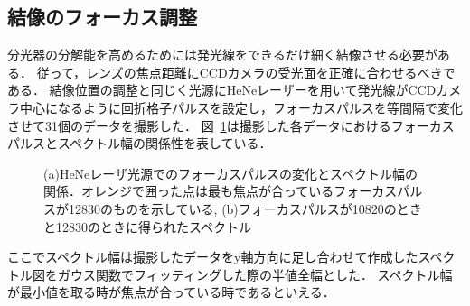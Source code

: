 \subsection{結像のフォーカス調整}
分光器の分解能を高めるためには発光線をできるだけ細く結像させる必要がある．
従って，レンズの焦点距離にCCDカメラの受光面を正確に合わせるべきである．
結像位置の調整と同じく光源にHeNeレーザーを用いて発光線がCCDカメラ中心になるように回折格子パルスを設定し，フォーカスパルスを等間隔で変化させて31個のデータを撮影した．
図\ \ref{fig:HeNe_focus_example}は撮影した各データにおけるフォーカスパルスとスペクトル幅の関係性を表している．
\begin{figure}
    \caption{
    (a)HeNeレーザ光源でのフォーカスパルスの変化とスペクトル幅の関係．オレンジで囲った点は最も焦点が合っているフォーカスパルスが12830のものを示している,
    (b)フォーカスパルスが10820のときと12830のときに得られたスペクトル}
    \label{fig:HeNe_focus_example}
\end{figure}
ここでスペクトル幅は撮影したデータをy軸方向に足し合わせて作成したスペクトル図をガウス関数でフィッティングした際の半値全幅とした．
スペクトル幅が最小値を取る時が焦点が合っている時であるといえる．

